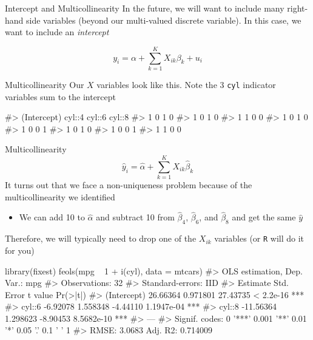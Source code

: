 \documentclass[aspectratio=169,t,11pt,table]{beamer}
\begin{document}
\begin{frame}{Intercept and Multicollinearity}
  In the future, we will want to include many right-hand side variables (beyond our multi-valued discrete variable). In this case, we want to include an \emph{intercept}

  \bigskip
  $$
    y_i = \alpha + \sum_{k=1}^K X_{ik} \beta_k + u_i
  $$
\end{frame}

\begin{frame}[fragile]{Multicollinearity}
  Our $X$ variables look like this. Note the 3 \texttt{cyl} indicator variables sum to the intercept
  \begin{codeblock}
#> (Intercept)   cyl::4   cyl::6   cyl::8
#>           1        0        1        0
#>           1        0        1        0
#>           1        1        0        0
#>           1        0        1        0
#>           1        0        0        1
#>           1        0        1        0
#>           1        0        0        1
#>           1        1        0        0
  \end{codeblock}
\end{frame}

\begin{frame}{Multicollinearity}
  \vspace*{-\bigskipamount}
  $$
    \hat{y}_i = \hat{\alpha} + \sum_{k=1}^K X_{ik} \hat{\beta}_k 
  $$
  It turns out that we face a non-uniqueness problem because of the \alert{multicollinearity} we identified 
  \begin{itemize}
    \item We can add 10 to $\hat{\alpha}$ and subtract 10 from $\hat{\beta}_4$, $\hat{\beta}_6$, and $\hat{\beta}_8$ and get the same $\hat{y}$
  \end{itemize}

  \bigskip
  Therefore, we will typically need to drop one of the $X_{ik}$ variables (or \texttt{R} will do it for you)
\end{frame}

\begin{frame}[fragile]{}
  \begin{codeblock}
library(fixest)
feols(mpg ~ 1 + i(cyl), data = mtcars)
#> OLS estimation, Dep. Var.: mpg
#> Observations: 32
#> Standard-errors: IID 
#>              Estimate Std. Error  t value   Pr(>|t|)    
#> (Intercept)  26.66364   0.971801 27.43735  < 2.2e-16 ***
#> cyl::6       -6.92078   1.558348 -4.44110 1.1947e-04 ***
#> cyl::8      -11.56364   1.298623 -8.90453 8.5682e-10 ***
#> ---
#> Signif. codes:  0 '***' 0.001 '**' 0.01 '*' 0.05 '.' 0.1 ' ' 1
#> RMSE: 3.0683   Adj. R2: 0.714009
  \end{codeblock}
\end{frame}
\end{document}
